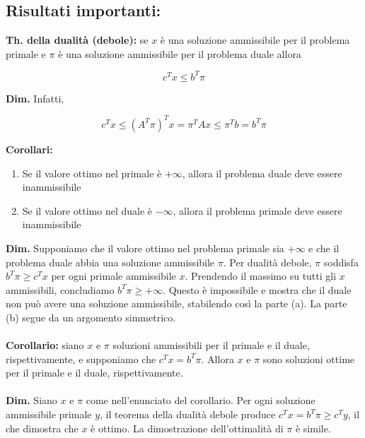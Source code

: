 \documentclass[a4paper, 11pt]{article}
\begin{document}
        \subsection{Risultati importanti: }
        \textbf{Th. della dualità (debole):} se $x$ è una soluzione ammissibile per il problema primale e $\pi$ è una soluzione ammissibile per il problema duale allora
        
        \begin{equation*}
            c^T x \leq b^T \pi
        \end{equation*}
        
        \textbf{Dim. } Infatti,

        \begin{equation*}
            c^T x \leq (A^T \pi)^T x = \pi^T A x \leq \pi^T b = b^T \pi
        \end{equation*}
    
        \textbf{Corollari: }
        \begin{enumerate}
            \item Se il valore ottimo nel primale è $+\infty$, allora il problema duale deve essere inammissibile
            \item Se il valore ottimo nel duale è $-\infty$, allora il problema primale deve essere inammissibile
        \end{enumerate}

        \textbf{Dim.} Supponiamo che il valore ottimo nel problema primale sia $+\infty$ e che il problema duale abbia una soluzione ammissibile $\pi$. Per dualità debole, $\pi$ soddisfa $b^T \pi \geq c^T x$ per ogni primale ammissibile $x$. Prendendo il massimo su tutti gli $x$ ammissibili, concludiamo $b^T \pi \geq +\infty$. Questo è impossibile e mostra che il duale non può avere una soluzione ammissibile, stabilendo così la parte (a). La parte (b) segue da un argomento simmetrico.
        
        \paragraph{}
        \textbf{Corollario: } siano $x$ e $\pi$ soluzioni ammissibili per il primale e il duale, rispettivamente, e supponiamo che $c^T x = b^T \pi$. Allora $x$ e $\pi$ sono soluzioni ottime per il primale e il duale, rispettivamente.

        \paragraph{}
        \textbf{Dim.} Siano $x$ e $\pi$ come nell'enunciato del corollario. Per ogni soluzione ammissibile primale $y$, il teorema della dualità debole produce $c^T x = b^T \pi \geq c^T y$, il che dimostra che $x$ è ottimo. La dimostrazione dell'ottimalità di $\pi$ è simile.
        
\end{document}
